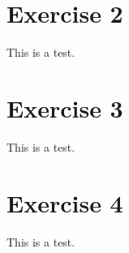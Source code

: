 \documentclass[10pt]{article}
\begin{document}



\section{Exercise 2}

This is a test. 

\section{Exercise 3}

This is a test. 

\section{Exercise 4}

This is a test. 
\end{document}
